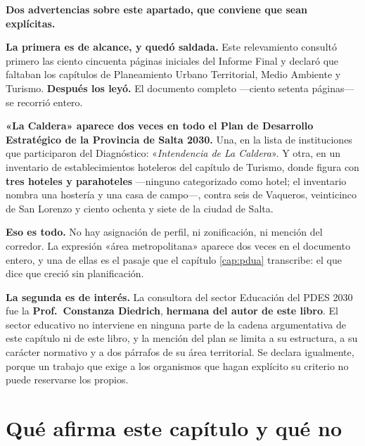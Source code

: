 \begin{cautela}
\textbf{Dos advertencias sobre este apartado, que conviene que sean explícitas.}

\textbf{La primera es de alcance, y quedó saldada.} Este relevamiento consultó primero las
ciento cincuenta páginas iniciales del Informe Final y declaró que faltaban los capítulos de
Planeamiento Urbano Territorial, Medio Ambiente y Turismo. \textbf{Después los leyó.} El
documento completo ---ciento setenta páginas--- se recorrió entero.

\textbf{«La Caldera» aparece dos veces en todo el Plan de Desarrollo Estratégico de la Provincia
de Salta 2030.} Una, en la lista de instituciones que participaron del Diagnóstico:
«\textit{Intendencia de La Caldera}». Y otra, en un inventario de establecimientos hoteleros del
capítulo de Turismo, donde figura con \textbf{tres hoteles y parahoteles} ---ninguno
categorizado como hotel; el inventario nombra una hostería y una casa de campo---, contra seis de Vaqueros,
veinticinco de San Lorenzo y ciento ochenta y siete de la ciudad de Salta.

\textbf{Eso es todo.} No hay asignación de perfil, ni zonificación, ni mención del corredor. La
expresión «área metropolitana» aparece dos veces en el documento entero, y una de ellas es el
pasaje que el capítulo \ref{cap:pdua} transcribe: el que dice que creció sin planificación.

\textbf{La segunda es de interés.} La consultora del sector Educación del PDES 2030 fue la
\textbf{Prof.\ Constanza Diedrich}, \textbf{hermana del autor de este libro}. El sector
educativo no interviene en ninguna parte de la cadena argumentativa de este capítulo ni de este
libro, y la mención del plan se limita a su estructura, a su carácter normativo y a dos
párrafos de su área territorial. Se declara igualmente, porque un trabajo que exige a los
organismos que hagan explícito su criterio no puede reservarse los propios.
\end{cautela}

\section{Qué afirma este capítulo y qué no}

